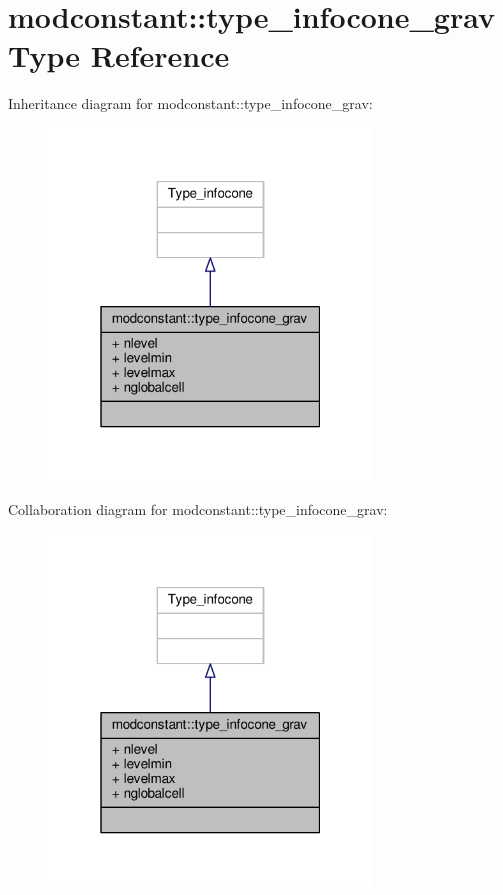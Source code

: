 \hypertarget{structmodconstant_1_1type__infocone__grav}{}\section{modconstant\+:\+:type\+\_\+infocone\+\_\+grav Type Reference}
\label{structmodconstant_1_1type__infocone__grav}


Inheritance diagram for modconstant\+:\+:type\+\_\+infocone\+\_\+grav\+:\nopagebreak
\begin{figure}[H]
\begin{center}
\leavevmode
\includegraphics[width=244pt]{structmodconstant_1_1type__infocone__grav__inherit__graph}
\end{center}
\end{figure}


Collaboration diagram for modconstant\+:\+:type\+\_\+infocone\+\_\+grav\+:\nopagebreak
\begin{figure}[H]
\begin{center}
\leavevmode
\includegraphics[width=244pt]{structmodconstant_1_1type__infocone__grav__coll__graph}
\end{center}
\end{figure}

